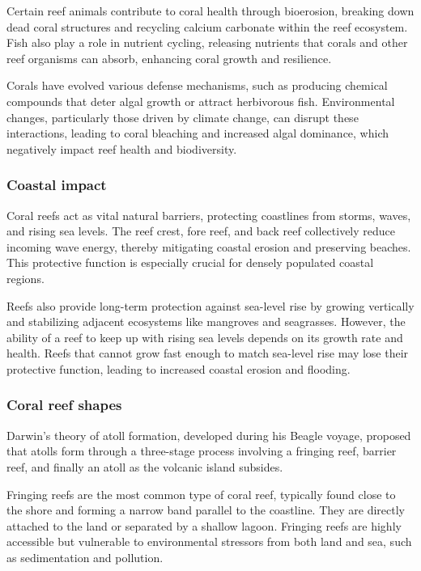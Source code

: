 Certain reef animals contribute to coral health through bioerosion, breaking down dead coral structures and recycling calcium carbonate within the reef ecosystem. Fish also play a role in nutrient cycling, releasing nutrients that corals and other reef organisms can absorb, enhancing coral growth and resilience.

Corals have evolved various defense mechanisms, such as producing chemical compounds that deter algal growth or attract herbivorous fish. Environmental changes, particularly those driven by climate change, can disrupt these interactions, leading to coral bleaching and increased algal dominance, which negatively impact reef health and biodiversity.

\subsubsection{Coastal impact}

Coral reefs act as vital natural barriers, protecting coastlines from storms, waves, and rising sea levels. The reef crest, fore reef, and back reef collectively reduce incoming wave energy, thereby mitigating coastal erosion and preserving beaches. This protective function is especially crucial for densely populated coastal regions.

Reefs also provide long-term protection against sea-level rise by growing vertically and stabilizing adjacent ecosystems like mangroves and seagrasses. However, the ability of a reef to keep up with rising sea levels depends on its growth rate and health. Reefs that cannot grow fast enough to match sea-level rise may lose their protective function, leading to increased coastal erosion and flooding.

\subsubsection{Coral reef shapes}

Darwin's theory of atoll formation, developed during his Beagle voyage, proposed that atolls form through a three-stage process involving a fringing reef, barrier reef, and finally an atoll as the volcanic island subsides.


Fringing reefs are the most common type of coral reef, typically found close to the shore and forming a narrow band parallel to the coastline. They are directly attached to the land or separated by a shallow lagoon. Fringing reefs are highly accessible but vulnerable to environmental stressors from both land and sea, such as sedimentation and pollution.

